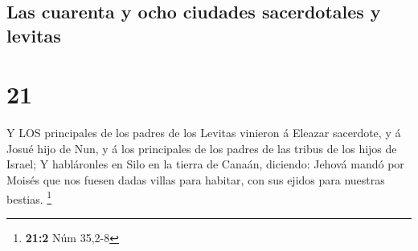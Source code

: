 \hypertarget{las-cuarenta-y-ocho-ciudades-sacerdotales-y-levitas}{%
\subsection{Las cuarenta y ocho ciudades sacerdotales y
levitas}\label{las-cuarenta-y-ocho-ciudades-sacerdotales-y-levitas}}

\hypertarget{section-20}{%
\section{21}\label{section-20}}

 Y LOS principales de los padres de los Levitas vinieron á
Eleazar sacerdote, y á Josué hijo de Nun, y á los principales de los
padres de las tribus de los hijos de Israel;  Y habláronles
en Silo en la tierra de Canaán, diciendo: Jehová mandó por Moisés que
nos fuesen dadas villas para habitar, con sus ejidos para nuestras
bestias. \footnote{\textbf{21:2} Núm 35,2-8}

